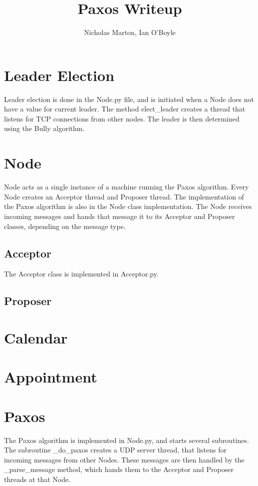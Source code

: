 \documentclass{article}
\begin{document}
	
	\title{Paxos Writeup}
	\author{Nicholas Marton, Ian O'Boyle}
	
	\maketitle
	
	\section{Leader Election}
		Leader election is done in the Node.py file, and is initiated when a Node does not have a value for current leader. The method elect\_leader creates a thread that listens for TCP connections from other nodes. The leader is then determined using the Bully algorithm. 
	\section{Node}
		Node acts as a single instance of a machine running the Paxos algorithm. Every Node creates an Acceptor thread and Proposer thread.  The implementation of the Paxos algorithm is also in the Node class implementation. The Node receives incoming messages and hands that message it to its Acceptor and Proposer classes, depending on the message type.
	\subsection{Acceptor}
	The Acceptor class is implemented in Acceptor.py. 
	\subsection{Proposer}
	\section{Calendar}
	\section{Appointment}
		\section{Paxos}
		The Paxos algorithm is implemented in Node.py, and starts several subroutines. The subroutine  \_do\_paxos creates a UDP server thread, that listens for incoming messages from other Nodes. These messages are then handled by the \_parse\_message method, which hands them to the Acceptor and Proposer
		threads at that Node. 
\end{document}
